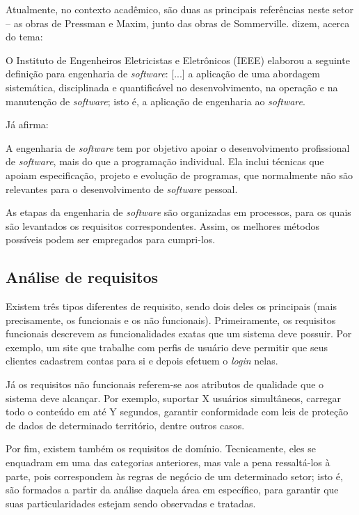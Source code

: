 \documentclass[
  12pt,
  a4paper,
  oneside,
  chapter=TITLE,
  subsection=TITLE,
  sumario=abnt-6027-2012,
  english,
  brazil
]{abntex2}
\begin{document}
Atualmente, no contexto acadêmico, são duas as principais referências
neste setor -- as obras de Pressman e Maxim, junto das obras de
Sommerville.  dizem, acerca do tema:

\begin{citacao}
O Instituto de Engenheiros Eletricistas e Eletrônicos (IEEE) elaborou a
seguinte definição para engenharia de \emph{software}: {[}...{]} a
aplicação de uma abordagem sistemática, disciplinada e quantificável no
desenvolvimento, na operação e na manutenção de \emph{software}; isto é,
a aplicação de engenharia ao \emph{software}.
\end{citacao}

Já  afirma:

\begin{citacao}
A engenharia de \emph{software} tem por objetivo apoiar o
desenvolvimento profissional de \emph{software}, mais do que a
programação individual. Ela inclui técnicas que apoiam especificação,
projeto e evolução de programas, que normalmente não são relevantes para
o desenvolvimento de \emph{software} pessoal.
\end{citacao}

As etapas da engenharia de \emph{software} são organizadas em processos,
para os quais são levantados os requisitos correspondentes. Assim, os
melhores métodos possíveis podem ser empregados para cumpri-los.

\subsection{Análise de requisitos}

Existem três tipos diferentes de requisito, sendo dois deles os
principais (mais precisamente, os funcionais e os não funcionais).
Primeiramente, os requisitos funcionais descrevem as funcionalidades
exatas que um sistema deve possuir. Por exemplo, um site que trabalhe
com perfis de usuário deve permitir que seus clientes cadastrem contas
para si e depois efetuem o \emph{login} nelas.

Já os requisitos não funcionais referem-se aos atributos de qualidade
que o sistema deve alcançar. Por exemplo, suportar X usuários
simultâneos, carregar todo o conteúdo em até Y segundos, garantir
conformidade com leis de proteção de dados de determinado território,
dentre outros casos.

Por fim, existem também os requisitos de domínio. Tecnicamente, eles
se enquadram em uma das categorias anteriores, mas vale a pena
ressaltá-los à parte, pois correspondem às regras de negócio de um
determinado setor; isto é, são formados a partir da análise daquela área
em específico, para garantir que suas particularidades estejam sendo
observadas e tratadas.
\end{document}
